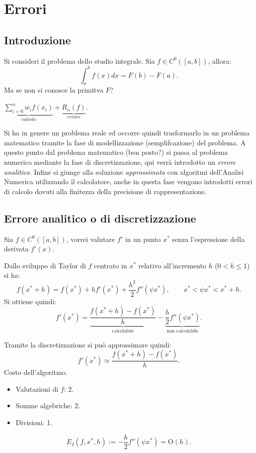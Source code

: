 \chapter{Errori}
\section{Introduzione}
Si consideri il problema dello studio integrale. Sia $f \in C^0([a,b])$, 
allora:
\[\int_a^bf(x)dx = F(b) - F(a).\]
Ma se non si conosce la primitva $F$?
\begin{flushleft}
$\underbrace{\sum_{i = 0}^n w_if(x_i)}_{calcolo} + \underbrace{R_n(f)}_{errore}$.
\end{flushleft}

Si ha in genere un problema reale ed occorre quindi trasformarlo in un
problema matematico tramite la fase di modellizzazione (semplifcazione) del
problema. A questo punto dal problema matematico (ben posto?) si passa al 
problema numerico mediante la fase di discretizzazione, qui verrà introdotto 
un \emph{errore analitico}. Infine si giunge alla soluzione 
\emph{approssimata} con algoritmi dell'Analisi Numerica utilizzando il 
calcolatore, anche in questa fase vengono introdotti errori di calcolo dovuti
alla finitezza della precisione di rappresentazione.

\section{Errore analitico o di discretizzazione}
Sia $f \in C^0([a,b])$, vorrei valutare $f'$ in un punto $x^*$ senza
l'espressione della derivata $f'(x)$.

Dallo sviluppo di Taylor di $f$ centrato in $x^*$ relativo all'incremento $h$
($ 0 < h \leq 1$) si ha:
\[
f(x^* + h) = f(x^*) + hf'(x^*) + \frac{h^2}{2}f''(\psi x^*), \qquad x^* < 
\psi x^* < x^* +h. 
\]
Si ottiene quindi:
\[f'(x^*) = 
\underbrace{\frac{f(x^* + h) - f(x^*)}{h}}_{\textrm{calcolabile}}  - 
\underbrace{\frac{h}{2}f''(\psi x^*)}_{\textrm{non calcolabile}}.
\]

Tramite la discretizzazione si può approssimare quindi:
\[f'(x^*) \simeq \frac{f(x^* + h) - f(x^*)}{h} .\]
Costo dell'algoritmo.
\begin{itemize}
\item[]Valutazioni di $f$: 2.
\item[]Somme algebriche: 2.
\item[]Divisioni: 1.
\end{itemize}
\[E_I(f, x^*, h) := - \frac{h}{2}f''(\psi x^*) = \textrm{O}(h).\]


